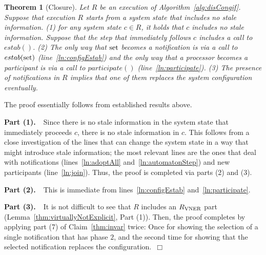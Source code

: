 \documentclass[11pt]{article}
\newcommand{\configEstab}{estab}
\newtheorem{theorem}{Theorem}[section]
\newenvironment{proof}{\noindent{\bf Proof.}}{\hfill$\Box$}
\begin{document}
\begin{theorem}[Closure]
\label{thm:closureThm}
Let $R$ be an execution of Algorithm~\ref{alg:disCongif}.
Suppose that execution $R$ starts from a system state that includes no stale information. (1) for any system state $c \in R$, it holds that 
$c$ includes no stale information. Suppose that the step that immediately follows $c$ includes a call to $\configEstab()$. (2) The only way that $\textnormal{set}$ becomes a notification is via a call to $\configEstab(\textnormal{set})$ (line~\ref{ln:configEstab}) and the only way that a processor becomes a participant is via a call to $participate()$ (line~\ref{ln:participate}). (3) The presence of notifications in $R$ implies that one of them replaces the system configuration eventually. 
\end{theorem}

\begin{proof} The proof essentially follows from established results above.
	
\noindent \textbf{Part (1).~}~Since there is no stale information in the system state that immediately proceeds $c$, there is no stale information in $c$. 
This follows from a close investigation of the 
lines that can change the system state in a way that might introduce stale information; the most  
relevant lines are the ones that deal with notifications (lines~\ref{ln:adoptAll} and~\ref{ln:automatonStep}) and new participants (line~\ref{ln:join}). 
Thus, the proof is completed via parts (2) and (3). 

\noindent \textbf{Part (2).~}~This is immediate from lines~\ref{ln:configEstab} and~\ref{ln:participate}.

\noindent \textbf{Part (3).~}~It is not difficult to see that $R$ includes an $R_{\textnormal{VNER}}$ part (Lemma~\ref{thm:virtuallyNotExplicit}, Part (1)). 
Then, the proof completes by applying part (7) of Claim~\ref{thm:invar} twice: Once for showing the selection of a single notification that has phase $2$, 
and the second time for showing that the selected notification replaces the configuration.~\end{proof}
\end{document}
